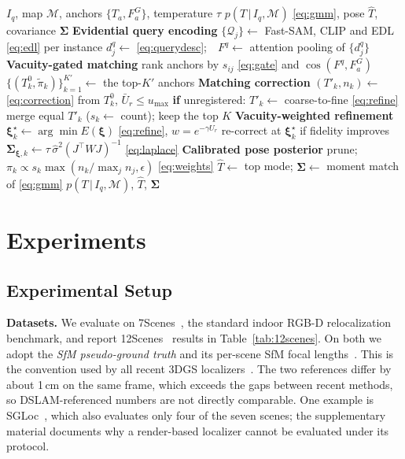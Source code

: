 \documentclass[journal]{IEEEtran}
\newcommand{\method}{USGLoc}
\begin{document}
\begin{algorithm}[t]
\caption{\method{} inference for one query image}
\label{alg:infer}
\algrenewcommand{}
\newcommand{\stage}[1]{\Statex\hspace{-\algorithmicindent}\textbf{#1}}
\begin{algorithmic}[1]
\Require $I_q$, map $\mathcal{M}$, anchors $\{T_a,F^G_a\}$, temperature $\tau$
\Ensure $p(T\,|\,I_q,\mathcal{M})$ \eqref{eq:gmm}, pose $\hat T$, covariance $\bm\Sigma$
\stage{Evidential query encoding}
\State $\{\mathcal{Q}_j\}\gets$ Fast-SAM, CLIP and EDL \eqref{eq:edl} per instance
\State $d^q_j\gets$ \eqref{eq:querydesc};\ \ $F^q\gets$ attention pooling of $\{d^q_j\}$
\stage{Vacuity-gated matching}
\State rank anchors by $s_{ij}$ \eqref{eq:gate} and $\cos(F^q,F^G_a)$ 
\State $\{(T^0_k,\tilde\pi_k)\}_{k=1}^{K'}\gets$ the top-$K'$ anchors
\stage{Matching correction}
  \State $(T'_k,n_k)\gets$ \eqref{eq:correction} from $T^0_k$, $\bar U_r\le u_{\max}$ 
  \State \textbf{if} unregistered: $T'_k\gets$ coarse-to-fine \eqref{eq:refine}
\EndFor
\State merge equal $T'_k$ ($s_k\gets$ count); keep the top $K$
\stage{Vacuity-weighted refinement}
  \State $\bm\xi^\star_k\gets\arg\min E(\bm\xi)$ \eqref{eq:refine}, $w=e^{-\gamma U_r}$ 
  \State re-correct at $\bm\xi^\star_k$ if fidelity improves
  \State $\bm\Sigma_{\bm\xi,k}\gets\tau\,\hat\sigma^2(J^\top WJ)^{-1}$ \eqref{eq:laplace} 
\EndFor
\stage{Calibrated pose posterior}
\State prune; $\pi_k\propto s_k\max(n_k/\max_j n_j,\epsilon)$ \eqref{eq:weights}
\State $\hat T\gets$ top mode; $\bm\Sigma\gets$ moment match of \eqref{eq:gmm}
\State \Return $p(T\,|\,I_q,\mathcal{M})$, $\hat T$, $\bm\Sigma$
\end{algorithmic}
\end{algorithm}

\section{Experiments}

\subsection{Experimental Setup}
\label{sec:setup}
\textbf{Datasets.} We evaluate on 7Scenes~\cite{sevenscenes_b}, the standard indoor RGB-D relocalization benchmark, and report 12Scenes~\cite{twelvescenes} results in Table~\ref{tab:12scenes}. On both we adopt the \emph{SfM pseudo-ground truth} and its per-scene SfM focal lengths~\cite{brachmann2021dslam}. This is the convention used by all recent 3DGS localizers~\cite{gscpr,stdloc,ugsloc,splathloc}. The two references differ by about 1\,cm on the same frame, which exceeds the gaps between recent methods, so DSLAM-referenced numbers are not directly comparable. One example is SGLoc~\cite{sgloc}, which also evaluates only four of the seven scenes; the supplementary material documents why a render-based localizer cannot be evaluated under its protocol.
\end{document}
